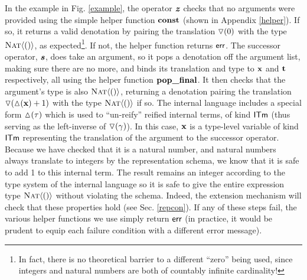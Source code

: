 \documentclass{llncs}
\begin{document}
In the example in Fig. \ref{example}, the operator $\textbf{\textit{z}}$ checks that no arguments were provided using the simple helper function ${\textbf{const}}$ (shown in Appendix \ref{helper}). If so, it returns a valid denotation by pairing the translation $\triangledown(0)$ with the type $\textsc{Nat}\langle()\rangle$, as expected\footnote{In fact, there is no theoretical barrier to a different ``zero'' being used, since integers and natural numbers are both of countably infinite cardinality!}. If not, the helper function returns ${\sf err}$. The successor operator, $\textbf{\textit{s}}$, does take an argument, so it pops a denotation off the argument list, making sure there are no more, and binds its translation and type to ${\textbf{x}}$ and ${\textbf{t}}$ respectively, all using the helper function ${\textbf{pop\_final}}$. It then checks that the argument's type is also $\textsc{Nat}\langle()\rangle$, returning a denotation pairing the translation $\triangledown(\vartriangle\hspace{-2.5pt}({\textbf{x}}) + 1)$ with the type $\textsc{Nat}\langle()\rangle$ if so. The internal language includes a special form $\vartriangle\hspace{-2.5pt}(\tau)$ which is used to ``un-reify'' reified internal terms, of kind $\textsf{ITm}$ (thus serving as the left-inverse of $\triangledown(\gamma)$). In this case, ${\textbf{x}}$ is a type-level variable of kind $\textsf{ITm}$ representing the translation of the argument to the successor operator. Because we have checked that it is a natural number, and natural numbers always translate to integers by the representation schema, we know that it is safe to add 1 to this internal term. The result remains an integer according to the type system of the internal language so it is safe to give the entire expression type $\textsc{Nat}\langle()\rangle$ without violating the schema. Indeed, the extension mechanism will check that these properties hold (see Sec. \ref{repcon}). If any of these steps fail, the various helper functions we use simply return ${\sf err}$ (in practice, it would be prudent to equip each failure condition with a different error message).

\end{document}
